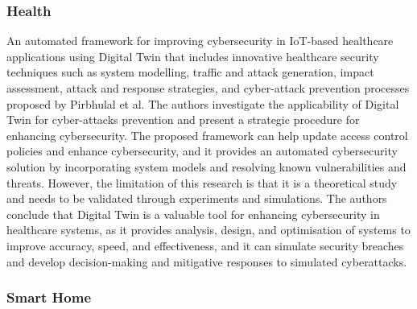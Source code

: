 \subsubsection*{Health}
An automated framework for improving cybersecurity in IoT-based healthcare applications using Digital Twin that includes innovative healthcare security techniques such as system modelling, traffic and attack generation, impact assessment, attack and response strategies, and cyber-attack prevention processes proposed by Pirbhulal et al.\cite{pirbhulalNovelFrameworkReinforcing2022} The authors investigate the applicability of Digital Twin for cyber-attacks prevention and present a strategic procedure for enhancing cybersecurity. The proposed framework can help update access control policies and enhance cybersecurity, and it provides an automated cybersecurity solution by incorporating system models and resolving known vulnerabilities and threats. However, the limitation of this research is that it is a theoretical study and needs to be validated through experiments and simulations. The authors conclude that Digital Twin is a valuable tool for enhancing cybersecurity in healthcare systems, as it provides analysis, design, and optimisation of systems to improve accuracy, speed, and effectiveness, and it can simulate security breaches and develop decision-making and mitigative responses to simulated cyberattacks. 

\subsubsection*{Smart Home}

